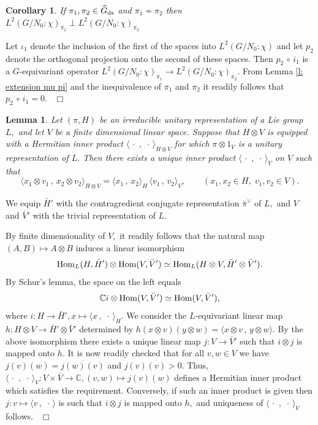 \documentclass[12pt,a4paper]{article}
\newtheorem{Cor}[Thm]{Corollary}
\newtheorem{Lemma}[Thm]{Lemma}
\newenvironment{cor}[0]{\begin{Cor}\noindent}%
{\end{Cor}}
\newenvironment{lemma}[0]{\begin{Lemma}\noindent}%
{\end{Lemma}}
\def\proof{\par\noindent{\it Proof.}{\ }{\ }}
\def\qed{~\hfill\hbox{$\Box$}\medbreak}
\def\qquad{\quad\quad}
\def\msy#1{{\mathbb #1}}
\def\C{{\msy C}}
\def\to{\rightarrow}
\def\inp#1#2{\langle#1\,,\,#2\rangle}
\def\Hom{{\rm Hom}}
\def\after{\,{\scriptstyle\circ}\,}
\numberwithin{Thm}{section}
\numberwithin{equation}{section}
\def\dotvar{\, \cdot\,}
\numberwithin{equation}{section}
\def\veec{\vee}%
\begin{document}
\begin{cor} 
\label{c: ortho ds subs}
If $\pi_1, \pi_2 \in \widehat G_{\rm ds}$ and $\pi_1\not\sim \pi_2$ 
 then  $L^2(G/N_0: \chi)_{\pi_1}\perp L^2(G/N_0: \chi)_{\pi_2}$ 
\end{cor}

\proof 
Let $\iota_1$ denote the inclusion of the first of the spaces into $L^2(G/N_0:\chi)$ 
and let $p_2$ denote the orthogonal projection onto the second of these spaces.
Then $p_2 \after i_1$ is a $G$-equivariant operator 
$L^2(G/N_0:\chi)_{\pi_1} \to L^2(G/N_0:\chi)_{\pi_2}.$ From Lemma \ref{l: extension mu pi} and the inequivalence of $\pi_1$ and $\pi_2$ it readily follows that $p_2 \after i_1 = 0.$ 
\qed

\begin{lemma}
\label{l: induced inner product}
Let $(\pi, H)$ be an irreducible unitary representation of a Lie group $L,$ 
and let $V$ be a finite  dimensional 
linear space. Suppose that $H \otimes V$ is equipped with a Hermitian  inner product 
$\inp{\dotvar}{\dotvar}_{H\otimes V}$ for which $\pi \otimes 1_V$ is a unitary representation of $L.$ Then there exists a unique inner product $\inp{\dotvar}{\dotvar}_V$ on $V$ such that 
\begin{equation}
\label{e: tensor prod inner prod} 
\inp{x_1\otimes v_1}{x_2\otimes v_2}_{H\otimes V} = \inp{x_1}{x_2}_{H} \,
\inp{v_1}{v_2}_{V}, \qquad (x_1, x_2 \in H, \; v_1, v_2 \in V).
\end{equation} 
\end{lemma} 

\proof
We equip $\bar H'$ with the contragredient conjugate representation $\bar \pi^\veec$ 
of $L,$ and $V$ and $\bar V'$ with the trivial representation of $L.$ 
 
 By finite dimensionality of $V,$ it readily follows that the natural map
$(A, B) \mapsto A \otimes B$ induces a linear isomorphism 
$$
\Hom_L(H, \bar H') \otimes \Hom(V, \bar V') \simeq  \Hom_L(H \otimes V, \bar H' \otimes \bar V').
$$ 
By Schur's lemma, the space on the left equals
$$ 
\C i \otimes \Hom(V, \bar V') \simeq \Hom(V, \bar V'),
$$ 
where $i: H \to \bar H', x \mapsto \inp{x}{\dotvar}_H.$ 
We consider the $L$-equivariant linear map $h: H\otimes V \to \bar H' \otimes \bar V'$ determined by
$h(x \otimes v)(y \otimes w) = \inp{x\otimes v}{y \otimes w}.$ By the above isomorphism
there exists a unique linear map $j: V \to \bar V'$ such that $i\otimes j$ is mapped onto $h.$ 
It is now readily checked that for all $v, w\in V$ we have $j(v)(w) = \overline{j(w)(v)}$ 
and $j(v)(v) > 0.$ Thus, $\inp{\dotvar}{\dotvar}_V : V \times \bar V \to \C, (v,w) \mapsto j(v)(w)$ defines a Hermitian inner product which satisfies the requirement. Conversely, if such an inner product is given then $j: v\mapsto \inp{v}{\dotvar}$ is such that $i \otimes j$ is mapped onto $h,$ 
and uniqueness of $\inp{\dotvar}{\dotvar}_V$ follows.
\qed 
\end{document}

